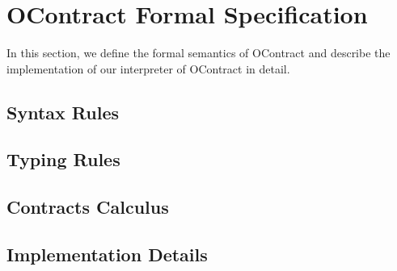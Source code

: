 \documentclass[a4paper]{article}
\begin{document}
\section{OContract Formal Specification}

In this section, we define the formal semantics of OContract and describe the implementation of our interpreter of OContract in detail.

\subsection{Syntax Rules}

\subsection{Typing Rules}

\subsection{Contracts Calculus}

\subsection{Implementation Details}



\end{document}
